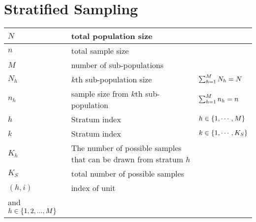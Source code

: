 \section{Stratified Sampling \cite{statistics/book/Statistics-for-Data-Scientists/Maurits-Kaptein}}\label{Sampling Plans/Representative Sampling/Stratified Sampling}

\begin{customArrayStretch}{1.3}
\begin{table}[H]
    \centering
    \begin{tabular}{>{\centering\arraybackslash}p{1.5cm} p{9cm} p{3.5cm}}
        \hline
        
        $N$ & total population size & \\ \hline
        
        $n$ & total sample size & \\ \hline
        
        $M$ & number of sub-populations & \\ \hline
        
        $N_h$ & $k$th sub-population size & $\textstyle\sum_{h=1}^{M} N_h = N$ \\ \hline
        
        $n_h$ & sample size from $k$th sub-population & $\textstyle\sum_{h=1}^{M} n_h = n$ \\ \hline

        $h$ & Stratum index & $h \in \left\{1, \cdots, M\right\}$ \\ \hline

        $k$ & Stratum index & $k \in \left\{1, \cdots, K_S\right\}$ \\ \hline
        
        $K_h$ & The number of possible samples that can be drawn from stratum $h$ \\ \hline
        
        $K_S$ & total number of possible samples \\ \hline
        
        $(h, i)$ & index of unit & \begin{minipage}{3.2cm}
            \vspace{0.1cm}
            $i \in \dCurlyBrac{1, 2,\cdots, N_h }$ \\
            and $h \in \left\{1, 2,..., M\right\}$
            \vspace{0.1cm}
        \end{minipage}  \\ \hline
        

\end{tabular}
\end{table}
\end{customArrayStretch}
